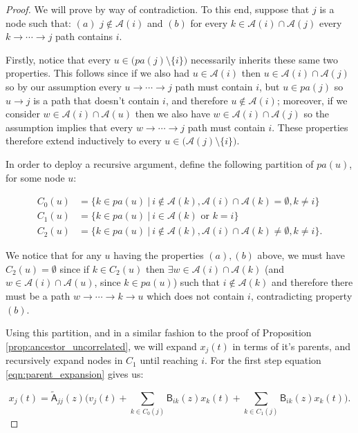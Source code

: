 \documentclass{statsoc}
\def\B{\mathsf{B}}  %
\def\A{\mathsf{A}}  %
\newcommand{\pa}[1]{pa(#1)}  %
\newcommand{\anc}[1]{\mathcal{A}(#1)}  %
\newcommand{\gcgpath}[2]{#1 \rightarrow \cdots \rightarrow #2}  %
\begin{document}
\begin{proof}
  We will prove by way of contradiction.  To this end, suppose that
  $j$ is a node such that: $(a)$ $j \not \in \anc{i}$ and $(b)$ for
  every $k \in \anc{i} \cap \anc{j}$ every
  $k \rightarrow \cdots \rightarrow j$ path contains $i$.

  Firstly, notice that every $u \in \big(\pa{j} \setminus \{i\}\big)$
  necessarily inherits these same two properties.  This follows since
  if we also had $u \in \anc{i}$ then $u \in \anc{i} \cap \anc{j}$ so by our
  assumption every $u \rightarrow \cdots \rightarrow j$ path must contain
  $i$, but $u \in \pa{j}$ so $u \rightarrow j$ is a path that doesn't contain
  $i$, and therefore $u \not\in \anc{i}$; moreover, if we consider
  $w \in \anc{i} \cap \anc{u}$ then we also have
  $w \in \anc{i} \cap \anc{j}$ so the assumption implies that every
  $w \rightarrow \cdots \rightarrow j$ path must contain $i$.  These properties therefore
  extend inductively to every $u \in \big(\anc{j} \setminus \{i\}\big)$.

  In order to deploy a recursive argument, define the following
  partition of $\pa{u}$, for some node $u$:

  \begin{align*}
    C_0(u) &= \{k \in \pa{u}\ |\ i \not\in \anc{k}, \anc{i} \cap \anc{k} = \emptyset, k \ne i\}\\
    C_1(u) &= \{k \in \pa{u}\ |\ i \in \anc{k} \text{ or } k = i\}\\
    C_2(u) &= \{k \in \pa{u}\ |\ i \not\in \anc{k}, \anc{i} \cap \anc{k} \ne \emptyset, k \ne i\}.
  \end{align*}

  We notice that for any $u$ having the properties $(a), (b)$ above,
  we must have $C_2(u) = \emptyset$ since if $k \in C_2(u)$ then
  $\exists w \in \anc{i} \cap \anc{k}$ (and
  $w \in \anc{i} \cap \anc{u}$, since $k \in \pa{u}$) such that
  $i \not \in \anc{k}$ and therefore there must be a path
  $\gcgpath{w}{k} \rightarrow u$ which does not contain $i$, contradicting
  property $(b)$.

  Using this partition, and in a similar fashion to the proof of
  Proposition \ref{prop:ancestor_uncorrelated}, we will expand
  $x_j(t)$ in terms of it's parents, and recursively expand nodes in
  $C_1$ until reaching $i$.  For the first step equation
  \eqref{eqn:parent_expansion} gives us:

  \begin{equation}
    \label{eqn:xj_partition_expansion}
    x_j(t) = \widetilde{\A}_{jj}(z) \Big(v_j(t) + \sum_{k \in C_0(j)} \B_{ik}(z)x_k(t) + \sum_{k \in C_1(j)}\B_{ik}(z)x_k(t)\Big).
  \end{equation}


\end{proof}
\end{document}
